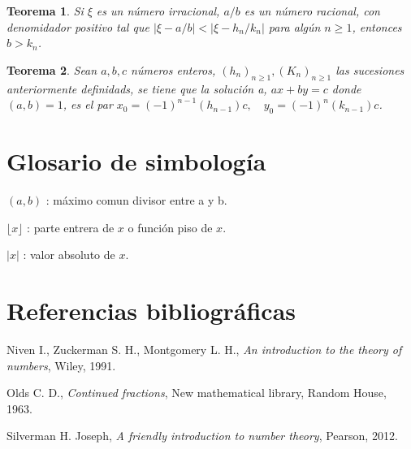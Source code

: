 \documentclass[11pt, article]{article}
\newtheorem{theorem}{Teorema} %
\begin{document}
     \begin{theorem}
         Si $\xi$ es un número irracional, $a/b$ es un número racional, con denomidador positivo tal que $|\xi - a/b|<|\xi-h_n/k_n|$ para algún $n\geq 1$, entonces $b>k_n$.
     \end{theorem} 
     
    \begin{theorem}
        Sean  $a,b,c$ números enteros, $(h_n)_{n\geq 1}, (K_n)_{n\geq 1}$ las sucesiones anteriormente definidads, se tiene que la solución a, $ax+by=c$ donde $(a,b)=1$, es el par $x_0 = (-1)^{n-1} (h_{n-1})c,\quad y_0=(-1)^n (k_{n-1})c$.
     
    \end{theorem} 
    
     \section*{Glosario de simbología}
     
     $(a,b)$ : máximo comun divisor entre a y b.
     
     $\lfloor x \rfloor$ : parte entrera  de $x$ o función piso de $x$.
     
     $|x|$ : valor absoluto de $x$.

     \section*{Referencias bibliográficas}
     Niven I., Zuckerman S. H., Montgomery L. H., \textit{An introduction to the theory of numbers}, Wiley, 1991.
    
      Olds C. D., \textit{Continued fractions}, New mathematical library, Random House, 1963.
     
     Silverman H. Joseph, \textit{A friendly introduction to number theory}, Pearson, 2012.
     
\end{document}
